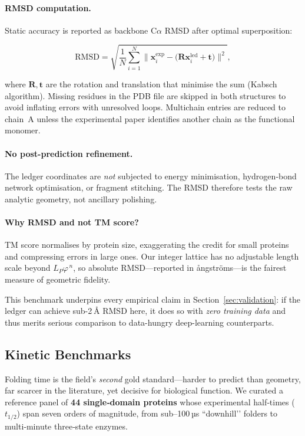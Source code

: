 \documentclass[11pt]{article}
\newcommand{\phiGR}{\varphi}                 %
\newcommand{\LP}{L_{\!P}}                    %
\begin{document}
\paragraph{RMSD computation.}
Static accuracy is reported as backbone C$\alpha$ RMSD after optimal
superposition:

\[
\mathrm{RMSD}
=
\sqrt{\frac{1}{N}
        \sum_{i=1}^{N}
        \bigl\|
              \mathbf x_{i}^{\mathrm{exp}}
              -\!
              \bigl( \mathbf R\mathbf x_{i}^{\mathrm{led}}
                      +\mathbf t \bigr)
        \bigr\|^{2}},
\]

where $\mathbf R,\mathbf t$ are the rotation and translation that
minimise the sum (Kabsch algorithm).  Missing residues in the PDB file
are skipped in both structures to avoid inflating errors with
unresolved loops.  Multichain entries are reduced to chain~A unless the
experimental paper identifies another chain as the functional monomer.

\paragraph{No post-prediction refinement.}
The ledger coordinates are \emph{not} subjected to energy minimisation,
hydrogen‐bond network optimisation, or fragment stitching.  The RMSD
therefore tests the raw analytic geometry, not ancillary polishing.

\paragraph{Why RMSD and not TM score?}
TM score normalises by protein size, exaggerating the credit for small
proteins and compressing errors in large ones.  Our integer lattice has
no adjustable length scale beyond $\LP\phiGR^{\,n}$, so absolute
RMSD—reported in ångströms—is the fairest measure of geometric fidelity.

This benchmark underpins every empirical claim in
Section~\ref{sec:validation}: if the ledger can achieve sub-2 Å RMSD
here, it does so with \emph{zero training data} and thus merits serious
comparison to data-hungry deep-learning counterparts.

\subsection{Kinetic Benchmarks}\label{sec:validation-kinetics}

Folding time is the field’s \emph{second} gold standard—harder to
predict than geometry, far scarcer in the literature, yet decisive for
biological function.  We curated a reference panel of
\textbf{44 single‐domain proteins} whose experimental half‐times
($t_{1/2}$) span seven orders of magnitude, from sub–100 µs “downhill’’
folders to multi‐minute three‐state enzymes.
\end{document}
